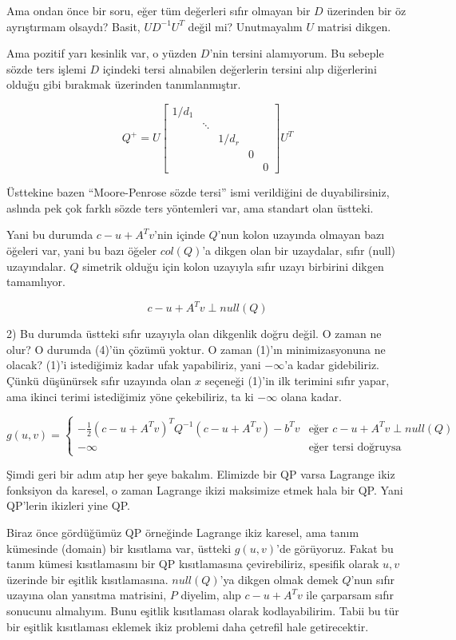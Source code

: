 \documentclass[12pt,fleqn]{article}\usepackage{../../common}
\begin{document}
Ama ondan önce bir soru, eğer tüm değerleri sıfır olmayan bir $D$ üzerinden
bir öz ayrıştırmam olsaydı? Basit, $U D^{-1} U^T$ değil mi? Unutmayalım $U$
matrisi dikgen.

Ama pozitif yarı kesinlik var, o yüzden $D$'nin tersini alamıyorum. Bu
sebeple sözde ters işlemi $D$ içindeki tersi alınabilen değerlerin tersini
alıp diğerlerini olduğu gibi bırakmak üzerinden tanımlanmıştır. 

$$
Q^+ = U \left[\begin{array}{ccccc}
1/d_1 & & & & \\
& \ddots & & & \\
& & 1/d_r & & \\
& &  & 0 & \\
& &  &  & 0 
\end{array}\right]
U^T
$$

Üsttekine bazen ``Moore-Penrose sözde tersi'' ismi verildiğini de
duyabilirsiniz, aslında pek çok farklı sözde ters yöntemleri var, ama
standart olan üstteki.

Yani bu durumda $c-u+A^T v$'nin içinde $Q$'nun kolon uzayında olmayan bazı
öğeleri var, yani bu bazı öğeler $col(Q)$'a dikgen olan bir uzaydalar,
sıfır (null) uzayındalar. $Q$ simetrik olduğu için kolon uzayıyla sıfır
uzayı birbirini dikgen tamamlıyor.

$$
c-u+A^T v \perp null(Q)
$$

2) Bu durumda üstteki sıfır uzayıyla olan dikgenlik doğru değil. O zaman ne
olur? O durumda (4)'ün çözümü yoktur. O zaman (1)'ın minimizasyonuna ne
olacak? (1)'i istediğimiz kadar ufak yapabiliriz, yani $-\infty$'a kadar
gidebiliriz. Çünkü düşünürsek sıfır uzayında olan $x$ seçeneği (1)'in ilk
terimini sıfır yapar, ama ikinci terimi istediğimiz yöne çekebiliriz, ta ki
$-\infty$ olana kadar.

$$
g(u,v) = 
\left\{ \begin{array}{ll}
-\frac{1}{2} (c - u + A^Tv)^T Q^{-1}  (c - u + A^Tv) - b^Tv & 
  \textrm{eğer } c - u + A^Tv \perp null(Q)\\
-\infty & \textrm{eğer tersi doğruysa}
\end{array} \right.
$$

Şimdi geri bir adım atıp her şeye bakalım. Elimizde bir QP varsa Lagrange
ikiz fonksiyon da karesel, o zaman Lagrange ikizi maksimize etmek hala bir
QP. Yani QP'lerin ikizleri yine QP. 

Biraz önce gördüğümüz QP örneğinde Lagrange ikiz karesel, ama tanım
kümesinde (domain) bir kısıtlama var, üstteki $g(u,v)$'de görüyoruz. Fakat
bu tanım kümesi kısıtlamasını bir QP kısıtlamasına çevirebiliriz, spesifik
olarak $u,v$ üzerinde bir eşitlik kısıtlamasına. $null(Q)$'ya dikgen olmak
demek $Q$'nun sıfır uzayına olan yansıtma matrisini, $P$ diyelim, alıp
$c - u + A^Tv$ ile çarparsam sıfır sonucunu almalıyım. Bunu eşitlik
kısıtlaması olarak kodlayabilirim. Tabii bu tür bir eşitlik kısıtlaması
eklemek ikiz problemi daha çetrefil hale getirecektir.
\end{document}
